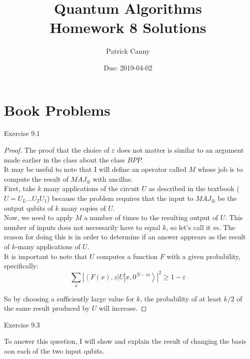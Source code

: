 \documentclass{exam} %
\theoremstyle{plain}
\theoremstyle{definition}
\theoremstyle{remark}
\numberwithin{equation}{section}  %
\renewcommand{\epsilon}{\varepsilon}
\renewcommand{\bra}[1]{ \left< #1 \right| }
\renewcommand{\ket}[1]{ \left| #1 \right> }
\begin{document}
\printanswers
\title{Quantum Algorithms \\ Homework 8 Solutions}
\author{Patrick Canny}
\date{Due: 2019-04-02}
\maketitle
\thispagestyle{foot}
\section{Book Problems}
\begin{questions}
  \question Exercise 9.1\\
  \begin{solution}
    \begin{proof}
      The proof that the choice of $\epsilon$ does not matter is similar to an
      argument made earlier in the class about the class $BPP$.\\

      It may be useful to note that I will define an operator called $M$ whose
      job is to compute the result of $MAJ_{\oplus}$ with ancillas.\\

      First, take $k$ many applications of the circuit $U$ as described in the
      textbook ($U = U_L\hdots U_2U_1$) because the problem requires that the
      input to $MAJ_{\oplus}$ be the output qubits of $k$ many copies of $U$.\\

      Now, we need to apply $M$ a number of times to the resulting output 
      of $U$. This number of inputs does not necessarily have to equal $k$, so
      let's call it $m$. The reason for doing this is in order to determine if
      an answer apprears as the result of $k$-many applications of $U$.\\

      It is important to note that $U$ computes a function $F$ with a given 
      probability, specifically:
      \[
        \sum_x |\bra{F(x), z}U\ket{x, 0^{N-m}}|^2 \geq 1-\epsilon
      \]

      So by choosing a sufficiently large value for $k$, the probability of
      at least $k/2$ of the same result produced by $U$ will increase. 
    \end{proof}
  \end{solution}
  \question Exercise 9.3\\
  \begin{solution}
    To answer this question, I will show and explain the result of changing the
    basis oon each of the two input qubits.\\


\end{solution}
\end{questions}
\end{document}
